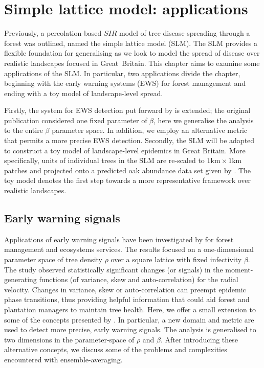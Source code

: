
\chapter{Simple lattice model: applications}
\label{chapter:SLM-applications}

Previously, a percolation-based $SIR$ model of tree disease spreading through a forest was outlined, named the simple lattice model (SLM).
The SLM provides a flexible foundation for generalising as we look to model the spread of disease over realistic landscapes focused in Great Britain.
This chapter aims to examine some applications of the SLM.
In particular, two applications divide the chapter, beginning with the early warning systems (EWS) for forest management and ending with a toy model of landscape-level spread.

Firstly, the system for EWS detection put forward by \cite{OROZCOFUENTES201912} is extended; the original publication considered one fixed parameter of $\beta$, here we generalise the analysis to the entire $\beta$ parameter space. In addition, we employ an alternative metric that permits a more precise EWS detection.
Secondly, the SLM will be adapted to construct a toy model of landscape-level epidemics in Great Britain.
More specifically, units of individual trees in the SLM are re-scaled to $\mathrm{1km \times 1km}$ patches 
and projected onto a predicted oak abundance data set given by \cite{hill.data}.
The toy model denotes the first step towards a more representative framework over realistic landscapes.

\section{Early warning signals}
\label{sec:EWS}

Applications of early warning signals have been investigated by \cite{OROZCOFUENTES201912} for forest management and ecosystems services.
The results focused on a one-dimensional parameter space of tree density $\rho$ over a square lattice with fixed infectivity $\beta$.
The study observed statistically significant changes (or signals) in the
moment-generating functions (of variance, skew and auto-correlation) for the radial velocity.
Changes in variance, skew or auto-correlation can preempt epidemic phase transitions, 
thus providing helpful information that could aid forest and plantation managers to maintain tree health. 
Here, we offer a small extension to some of the concepts presented by \cite{OROZCOFUENTES201912}.
In particular, a new domain and metric are used to detect more precise, early warning signals.  
The analysis is generalised to two dimensions in the parameter-space of $\rho$ and $\beta$. 
After introducing these alternative concepts, we discuss some of the problems and complexities encountered with ensemble-averaging. 

